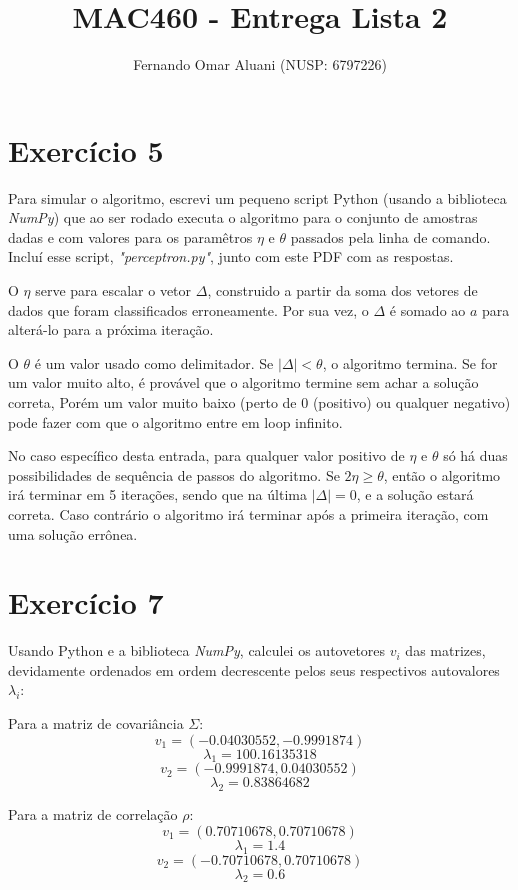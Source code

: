 \documentclass[a4paper,11pt]{article}
\title{MAC460 - Entrega Lista 2}
\author{Fernando Omar Aluani (NUSP: 6797226)}
\begin{document}
\maketitle

\section{Exercício 5}

Para simular o algoritmo, escrevi um pequeno script Python (usando a biblioteca \textit{NumPy})
que ao ser rodado executa o algoritmo para o conjunto de amostras dadas e com valores para os
paramêtros $\eta$ e $\theta$ passados pela linha de comando. Incluí esse script, \textit{"perceptron.py"}, 
junto com este PDF com as respostas.

O $\eta$ serve para escalar o vetor $\Delta$, construido a partir da soma dos vetores de dados que foram
classificados erroneamente. Por sua vez, o $\Delta$ é somado ao $a$ para alterá-lo para a próxima iteração.

O $\theta$ é um valor usado como delimitador. Se $\left|\Delta\right| < \theta$, o algoritmo termina.
Se for um valor muito alto, é provável que o algoritmo termine sem achar a solução correta, Porém um valor
muito baixo (perto de 0 (positivo) ou qualquer negativo) pode fazer com que o algoritmo entre em loop infinito.

No caso específico desta entrada, para qualquer valor positivo de $\eta$ e $\theta$ só há duas possibilidades
de sequência de passos do algoritmo. Se $2\eta \geq \theta$, então o algoritmo irá terminar em 5 iterações,
sendo que na última $\left|\Delta\right| = 0$, e a solução estará correta. Caso contrário o algoritmo irá
terminar após a primeira iteração, com uma solução errônea.


\section{Exercício 7}

Usando Python e a biblioteca \textit{NumPy}, calculei os autovetores $v_{i}$ das matrizes, devidamente
ordenados em ordem decrescente pelos seus respectivos autovalores $\lambda_{i}$:

Para a matriz de covariância $\Sigma$:
$$v_{1} = (-0.04030552, -0.9991874) $$
$$\lambda_{1} = 100.16135318 $$
$$v_{2} = (-0.9991874 ,  0.04030552) $$
$$\lambda_{2} = 0.83864682 $$

Para a matriz de correlação $\rho $:
$$v_{1} = (0.70710678,  0.70710678) $$
$$\lambda_{1} = 1.4 $$
$$v_{2} = (-0.70710678,  0.70710678) $$
$$\lambda_{2} = 0.6 $$
\end{document}
